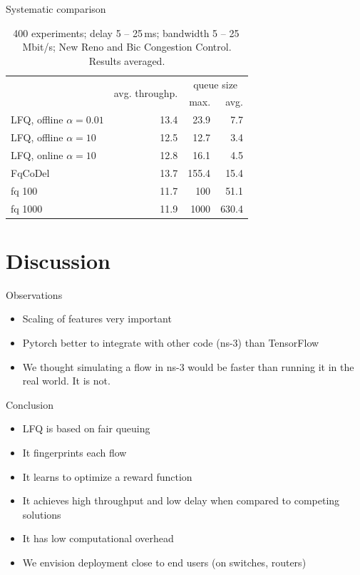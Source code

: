 \documentclass[xcolor={dvipsnames}]{beamer}
\begin{document}
\begin{frame}{Systematic comparison}
\begin{table}
\caption{400 experiments; delay 5 -- 25\,ms; bandwidth 5 -- 25\,Mbit/s; New Reno and Bic Congestion Control. Results averaged.} \label{tab:comparison_others}
\centering
\begin{tabular}{l r r r} \toprule
& \multirow{2}{*}{avg. throughp.} & \multicolumn{2}{c}{queue size} \\
& & max. & avg. \\ \midrule
LFQ, offline $\alpha=0.01$ & 13.4 & 23.9 & 7.7\\
LFQ, offline $\alpha=10$ & 12.5 & 12.7 & 3.4\\
LFQ, online $\alpha=10$ & 12.8 & 16.1 & 4.5\\
FqCoDel	& 13.7 & 155.4 & 15.4\\
fq 100	& 11.7 & 100 & 51.1\\
fq 1000	& 11.9 & 1000 & 630.4 \\
\bottomrule
\end{tabular}
\end{table}
\end{frame}

\section{Discussion}

\begin{frame}{Observations}
\begin{itemize}
\item Scaling of features very important
\item Pytorch better to integrate with other code (ns-3) than TensorFlow
\item We thought simulating a flow in ns-3 would be faster than running it in the real world. It is not.
\end{itemize}
\end{frame}

\begin{frame}{Conclusion}
\begin{itemize}
\item LFQ is based on fair queuing
\item It fingerprints each flow
\item It learns to optimize a reward function
\item It achieves high throughput and low delay when compared to competing solutions
\item It has low computational overhead
\item We envision deployment close to end users (on switches, routers)
\end{itemize}
\end{frame}
\end{document}
